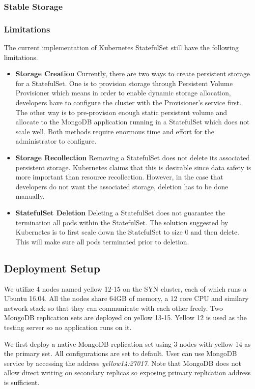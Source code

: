 \documentclass[sigconf]{acmart}
\begin{document}
\subsubsection{Stable Storage}

\subsubsection{Limitations} 
The current implementation of Kubernetes StatefulSet still have the following limitations.
\begin{itemize}
    \item \textbf{Storage Creation} Currently, there are two ways to create persistent storage for a StatefulSet. One is to provision storage through Persistent Volume Provisioner which means in order to enable dynamic storage allocation, developers have to configure the cluster with the Provisioner's service first. The other way is to pre-provision enough static persistent volume and allocate to the MongoDB application running in a StatefulSet which does not scale well. Both methods require enormous time and effort for the administrator to configure.
    \item \textbf{Storage Recollection} Removing a StatefulSet does not delete its associated persistent storage. Kubernetes claims that this is desirable since data safety is more important than resource recollection. However, in the case that developers do not want the associated storage, deletion has to be done manually.
    \item \textbf{StatefulSet Deletion} Deleting a StatefulSet does not guarantee the termination all pods within the StatefulSet. The solution suggested by Kubernetes is to first scale down the StatefulSet to size 0 and then delete. This will make sure all pods terminated prior to deletion.
\end{itemize}

\subsection{Deployment Setup}
We utilize 4 nodes named yellow 12-15 on the SYN cluster, each of which runs a Ubuntu 16.04. All the nodes share 64GB of memory, a 12 core CPU and similary network stack so that they can communicate with each other freely. Two MongoDB replication sets are deployed on yellow 13-15. Yellow 12 is used as the testing server so no application runs on it.

We first deploy a native MongoDB replication set using 3 nodes with yellow 14 as the primary set. All configurations are set to default. User can use MongoDB service by accessing the address \emph{yellow14:27017}. Note that MongoDB does not allow direct writing on secondary replicas so exposing primary replication address is sufficient.
\end{document}
